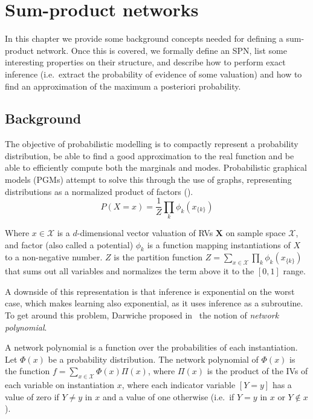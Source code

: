 \chapter{Sum-product networks}\label{chp:spn}

In this chapter we provide some background concepts needed for defining a sum-product network. Once
this is covered, we formally define an SPN, list some interesting properties on their structure,
and describe how to perform exact inference (i.e.\ extract the probability of evidence of some
valuation) and how to find an approximation of the maximum a posteriori probability.

\section{Background}

The objective of probabilistic modelling is to compactly represent a probability distribution, be
able to find a good approximation to the real function and be able to efficiently compute both
the marginals and modes. Probabilistic graphical models (PGMs) attempt to solve this through the
use of graphs, representing distributions as a normalized product of factors (\cite{pearl-1988}).
\begin{equation*}
  P(X=x)=\frac{1}{Z}\prod_k \phi_k(x_{\{k\}})
\end{equation*}

Where $x\in\mathcal{X}$ is a $d$-dimensional vector valuation of RVs $\mathbf{X}$ on sample space
$\mathcal{X}$, and factor (also called a potential) $\phi_k$ is a function mapping instantiations
of $X$ to a non-negative number. $Z$ is the partition function $Z=\sum_{x\in\mathcal{X}} \prod_k
\phi_k(x_{\{k\}})$ that sums out all variables and normalizes the term above it to the $[0,1]$
range.

A downside of this representation is that inference is exponential on the worst case, which makes
learning also exponential, as it uses inference as a subroutine. To get around this problem,
Darwiche proposed in~\cite{diff-approach-darwiche} the notion of \textit{network polynomial}.

A network polynomial is a function over the probabilities of each instantiation. Let $\Phi(x)$ be a
probability distribution. The network polynomial of $\Phi(x)$ is the function
$f=\sum_{x\in\mathcal{X}}\Phi(x)\Pi(x)$, where $\Pi(x)$ is the product of the IVs of each variable
on instantiation $x$, where each indicator variable $[Y=y]$ has a value of zero if $Y\neq y$ in $x$
and a value of one otherwise (i.e.\ if $Y=y$ in $x$ or $Y\not\in x$).

